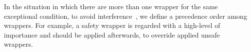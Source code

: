 


In the situation in which there are more than one wrapper for the same exceptional condition, to avoid interference~\cite{Katz:2008:IAI:1394496.1394500}, we define a precedence order among wrappers. For example, a safety wrapper is regarded with a high-level of importance and should be applied afterwards, to override applied unsafe wrappers. 

